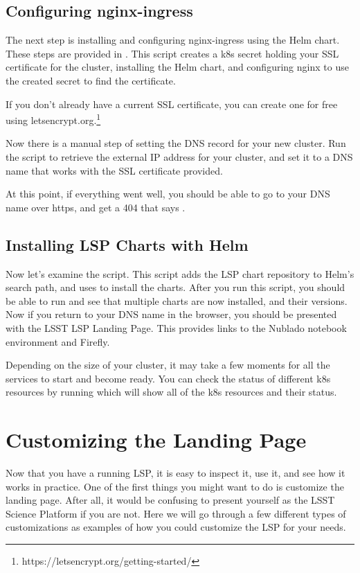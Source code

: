 \documentclass[11pt,twoside]{article}
\begin{document}
\subsection{Configuring nginx-ingress}

The next step is installing and configuring nginx-ingress using the Helm chart.
These steps are provided in .  This script creates
a k8s secret holding your SSL certificate for the cluster, installing the Helm
chart, and configuring nginx to use the created secret to find the certificate.

If you don't already have a current SSL certificate, you can create one for
free using letsencrypt.org.\footnote{https://letsencrypt.org/getting-started/}

Now there is a manual step of setting the DNS record for your new cluster.
Run the  script to retrieve the external IP address for your
cluster, and set it to a DNS name that works with the SSL certificate provided.

At this point, if everything went well, you should be able to go to your
DNS name over https, and get a 404 that says .

\subsection{Installing LSP Charts with Helm}

Now let's examine the  script.  This script adds the LSP
chart repository to Helm's search path, and uses  to install
the charts.  After you run this script, you should be able to run 
and see that multiple charts are now installed, and their versions.  Now if you
return to your DNS name in the browser, you should be presented with the LSST
LSP Landing Page.  This provides links to the Nublado notebook environment and
Firefly.

Depending on the size of your cluster, it may take a few moments for all the
services to start and become ready.  You can check the status of different
k8s resources by running  which will show all of
the k8s resources and their status.

\section{Customizing the Landing Page}

Now that you have a running LSP, it is easy to inspect it, use it, and see
how it works in practice.  One of the first things you might want to do is
customize the landing page.  After all, it would be confusing to present
yourself as the LSST Science Platform if you are not.  Here we will go
through a few different types of customizations as examples of how you
could customize the LSP for your needs.
\end{document}

